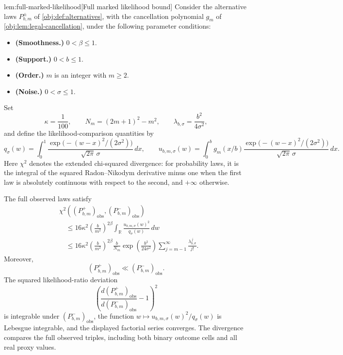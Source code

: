 \documentclass[11pt]{article}
\begin{document}
\begin{lemmav}{lem:full-marked-likelihood}[Full marked likelihood bound]
Consider the alternative laws \(P^\pm_{b,m}\) of \cref{obj:def:alternatives}, with the cancellation polynomial \(g_m\) of \cref{obj:lem:legal-cancellation}, under the following parameter conditions:
\begin{itemize}
\item \textbf{(Smoothness.)} \(0<\beta\le1\).
\item \textbf{(Support.)} \(0<b\le1\).
\item \textbf{(Order.)} \(m\) is an integer with \(m\ge2\).
\item \textbf{(Noise.)} \(0<\sigma\le1\).
\end{itemize}
Set
\[
\kappa=\frac1{100},
\qquad
N_m=(2m+1)^2-m^2,
\qquad
\lambda_{b,\sigma}=\frac{b^2}{4\sigma^2},
\]
and define the likelihood-comparison quantities by
\[
q_\sigma(w)
=\int_0^1
\frac{\exp\!\bigl(-(w-x)^2/(2\sigma^2)\bigr)}
{\sqrt{2\pi}\,\sigma}\,dx,
\qquad
u_{b,m,\sigma}(w)
=\int_0^b g_m(x/b)
\frac{\exp\!\bigl(-(w-x)^2/(2\sigma^2)\bigr)}
{\sqrt{2\pi}\,\sigma}\,dx.
\]
Here \(\chi^2\) denotes the extended chi-squared divergence: for probability laws, it is the integral of the squared Radon--Nikodym derivative minus one when the first law is absolutely continuous with respect to the second, and \(+\infty\) otherwise.

The full observed laws satisfy
\[
\begin{aligned}
&\chi^2\!\left(
(P^+_{b,m})_{\mathrm{obs}},
(P^-_{b,m})_{\mathrm{obs}}
\right)\\
&\quad\le
16\kappa^2\left(\frac{b}{m^2}\right)^{2\beta}
\int_{\mathbb R}
\frac{u_{b,m,\sigma}(w)^2}{q_\sigma(w)}\,dw\\
&\quad\le
16\kappa^2\left(\frac{b}{m^2}\right)^{2\beta}
\frac{b}{N_m}
\exp\!\left(\frac{b^2}{24\sigma^2}\right)
\sum_{j=m-1}^{\infty}\frac{\lambda_{b,\sigma}^{\,j}}{j!}.
\end{aligned}
\]
Moreover,
\[
(P^+_{b,m})_{\mathrm{obs}}
\ll
(P^-_{b,m})_{\mathrm{obs}}.
\]
The squared likelihood-ratio deviation
\[
\left(
\frac{d(P^+_{b,m})_{\mathrm{obs}}}
{d(P^-_{b,m})_{\mathrm{obs}}}-1
\right)^2
\]
is integrable under \((P^-_{b,m})_{\mathrm{obs}}\), the function
\(w\mapsto u_{b,m,\sigma}(w)^2/q_\sigma(w)\) is Lebesgue integrable, and the displayed factorial series converges. The divergence compares the full observed triples, including both binary outcome cells and all real proxy values.
\end{lemmav}
\end{document}
